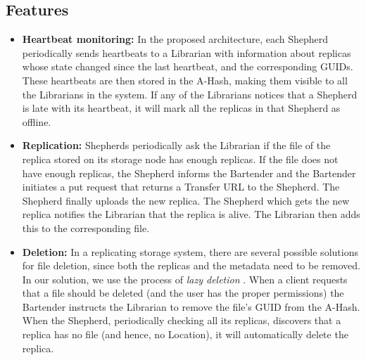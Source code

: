 \documentclass{llncs}
\begin{document}
\subsection{Features}
\label{Features}
\begin{itemize}

\item \textbf{Heartbeat monitoring:} In the proposed architecture, each Shepherd periodically sends
heartbeats to a Librarian with information about replicas
whose state changed since the last heartbeat, and the corresponding
GUIDs. These heartbeats are then stored in the A-Hash, making them
visible to all the Librarians in the system. If any of the Librarians
notices that a Shepherd is late with its heartbeat, it will mark
all the replicas in that Shepherd as offline.  


\item \textbf{Replication:} Shepherds periodically ask the Librarian if the file of the replica stored on
its storage node has enough replicas. If the file does not have
enough replicas, the Shepherd informs the Bartender and the Bartender initiates
a put request that returns a Transfer URL to the Shepherd. The
Shepherd finally uploads the new replica. The Shepherd which gets the new replica notifies the
Librarian that the replica is alive. The Librarian then adds this to
the corresponding file.


\item \textbf{Deletion:} In a replicating storage system, there are several possible solutions
for file deletion, since both the replicas and the metadata need to be
removed. In our solution, we use the process of \textit{lazy
  deletion} \cite{LazyDeletion}. When a client requests that a file
should be deleted (and the user has the proper permissions) the
Bartender instructs the Librarian to remove the file's GUID from the
A-Hash. When the Shepherd, periodically checking all its replicas,
discovers that a replica has no file (and hence, no Location), it will
automatically delete the replica.


\end{itemize}
\end{document}
